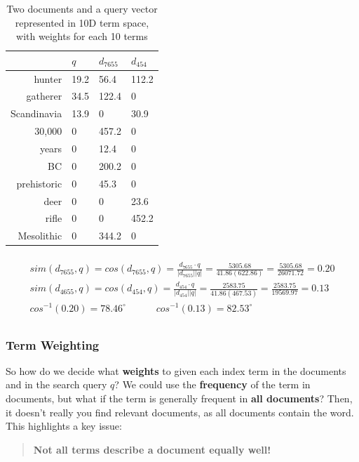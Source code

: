 \documentclass{article}
\begin{document}
\begin{table}[H]
	\centering
	\begin{tabular}{|r|l|l|l|}
		\hline
		& $q$ & $d_{7655}$ & $d_{454}$ \\
		\hline
		hunter & 19.2 & 56.4 & 112.2 \\
		gatherer & 34.5 & 122.4 & 0 \\
		Scandinavia & 13.9 & 0 & 30.9 \\
		30,000 & 0 & 457.2 & 0 \\
		years & 0 & 12.4 & 0 \\
		BC & 0 & 200.2 & 0 \\
		prehistoric & 0 & 45.3 & 0 \\
		deer & 0 & 0 & 23.6 \\
		rifle & 0 & 0 & 452.2 \\
		Mesolithic & 0 & 344.2 & 0 \\
		\hline
	\end{tabular}
	\caption{Two documents and a query vector represented in 10D term space, with weights for each 10 terms}
	\label{tab:cosine-similarity-example}
\end{table}

\begin{multline}\\
	sim(d_{7655}, q) = cos(d_{7655}, q) = \frac{d_{7655} \cdot q}{|d_{7655}| |q|} = \frac{5305.68}{41.86(622.86)} = \frac{5305.68}{26071.72} = 0.20 \\
	sim(d_{4655}, q) = cos(d_{454}, q) = \frac{d_{454} \cdot q}{|d_{454}| |q|} = \frac{2583.75}{41.86(467.53)} = \frac{2583.75}{19569.97} = 0.13 \\
	cos^{-1}(0.20) = 78.46^{\circ}
	\;\;\;\;\;\;\;\;\;\;\;
	cos^{-1}(0.13) = 82.53^{\circ} \\
	\label{eq:cosine-similarity-example}
\end{multline}

\subsubsection{Term Weighting}

So how do we decide what \textbf{weights} to given each index term in the documents and in the search query $q$? We could use the \textbf{frequency} of the term in documents, but what if the term is generally frequent in \textbf{all documents}? Then, it doesn't really you find relevant documents, as all documents contain the word. This highlights a key issue:
\begin{quote}
	\textbf{Not all terms describe a document equally well!}
\end{quote}
\end{document}
